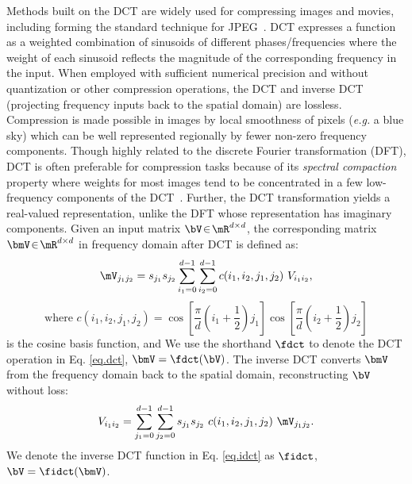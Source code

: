 \documentclass{article} %
\begin{document}
\label{sec:dct}%
Methods built on the DCT are widely used for compressing images and movies, including forming the standard technique for JPEG~\cite{wallace1991jpeg}.
DCT expresses a function as a weighted combination of sinusoids of different phases/frequencies where the weight of each sinusoid reflects the magnitude of the corresponding frequency in the input.
When employed with sufficient numerical precision and without quantization or other compression operations, the DCT and inverse DCT (projecting frequency inputs back to the spatial domain) are lossless.
Compression is made possible in images by local smoothness of pixels (\emph{e.g.} a blue sky) which can be well represented regionally by fewer non-zero frequency components.
Though highly related to the discrete Fourier transformation (DFT), DCT is often preferable for compression tasks because of its \emph{spectral compaction} property where weights for most images tend to be concentrated in a few low-frequency components of the DCT~\cite{rao2014discrete}.
Further, the DCT transformation yields a real-valued representation, unlike the DFT whose representation has imaginary components.
Given an input matrix $\bV\!\in\! \mR^{d\times d}$, the corresponding matrix $\bmV\!\in\! \mR^{d\times d}$ in frequency domain after DCT is defined as:
\begin{equation}
	\mV_{j_1 j_2} = s_{j_1} s_{j_2} \sum_{i_1=0}^{d-1} \sum_{i_2=0}^{d-1} c(i_1,i_2,j_1,j_2)\ V_{i_1 i_2},
	\label{eq.dct}
\end{equation}\begin{equation*}
    \textrm{where\ \ \ } c(i_1,i_2,j_1,j_2) =  \cos{\left[\frac{\pi}{d} \left(i_1+\frac{1}{2}\right)j_1 \right]}
	\cos{\left[\frac{\pi}{d} \left(i_2+\frac{1}{2}\right)j_2 \right]}
\end{equation*}
is the cosine basis function, and
We use the shorthand $\fdct$ to denote the DCT operation in Eq. \eqref{eq.dct}, \ie{}$\bmV=\fdct(\bV)$. The inverse DCT converts $\bmV$ from the frequency domain back to the spatial domain, reconstructing $\bV$ without loss:
\begin{equation}
	V_{i_1 i_2} = \sum_{j_1=0}^{d-1}  \sum_{j_2=0}^{d-1} s_{j_1} s_{j_2}\ c(i_1,i_2,j_1,j_2)\ \mV_{j_1 j_2}.
	\label{eq.idct}
\end{equation}
We denote the inverse DCT function in Eq. \eqref{eq.idct} as $\fidct$, \ie{}$\bV = \fidct(\bmV)$.
\end{document}
